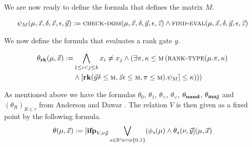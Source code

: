 \documentclass[../paper.tex]{subfiles}
\begin{document}
				
We are now ready to define the formula that defines the matrix $M$.
				
\begin{align*}
	\psi_M (\mu, \vec{x}, \delta, \vec{x}, \epsilon, \vec{y}) :=  \textsc{check-dom}(\mu, \vec{x}, \delta, \vec{y}, \epsilon, \vec{z}) \land \textsc{find-eval} (\mu, \vec{x}, \delta, \vec{y}, \epsilon, \vec{z}) 
\end{align*}
				
We now define the formula that evaluates a rank gate $g$.
				
\begin{align*}
	\theta_{\text{\textbf{rk}}} (\mu, \vec{x}) := & \bigwedge_{1 \leq i < j \leq k} x_i \neq x_j \land (\exists \pi, \kappa \leq \textsc{m} \, (\textsc{rank-type}(\mu. \pi, \kappa) \\ &\land [\text{\textbf{rk}} (\vec{y}\delta\leq \textsc{m}, \vec{z}\epsilon\leq \textsc{m}, \pi \leq \textsc{m}). \psi_M] \leq \kappa )))
\end{align*}
				
As mentioned above we have the formulas $\theta_0$, $\theta_1$, $\theta_\land$,
$\theta_\lor$, $\theta_{\text{\textbf{nand}}}$, $\theta_{\text{\textbf{maj}}}$ and $(\theta_R)_{R \in \tau}$ from
Anderson and Dawar \cite{AndersonD17}. The relation $V$ is then given as a fixed
point by the following formula.
\begin{align*}
	\theta (\mu, \vec{x}) := [\text{\textbf{ifp}}_{V,\nu \vec{y}} \bigvee_{s \in \mathbb{B}' \uplus \tau \uplus \{0,1\}} (\phi_s(\mu) \land \theta_s (\nu, \vec{y} ] (\mu, \vec{x}) 
\end{align*}
				
\end{document}
